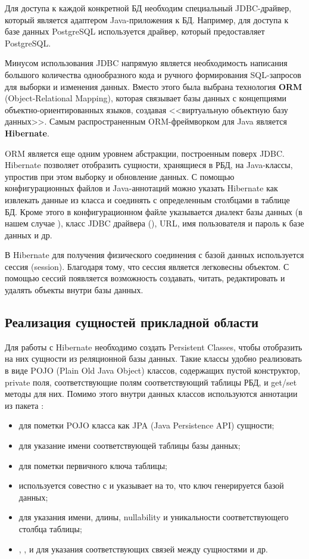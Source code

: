 Для доступа к каждой конкретной БД необходим специальный JDBC-драйвер, который является адаптером Java-приложения к БД. Например, для доступа к базе данных PostgreSQL используется драйвер, который предоставляет PostgreSQL. 

Минусом использования JDBC напрямую является необходимость написания большого количества однообразного кода и ручного формирования SQL-запросов для выборки и изменения данных. Вместо этого была выбрана технология \textbf{ORM} (Object-Relational Mapping), которая связывает базы данных с концепциями объектно-ориентированных языков, создавая <<виртуальную объектную базу данных>>. Самым распространенным ORM-фреймворком для Java является \textbf{Hibernate}.

ORM является еще одним уровнем абстракции, построенным поверх JDBC. Hibernate позволяет отобразить сущности, хранящиеся в РБД, на Java-классы, упростив при этом выборку и обновление данных. С помощью конфигурационных файлов и Java-аннотаций можно указать Hibernate как извлекать данные из класса и соединять с определенным столбцами в таблице БД. Кроме этого в конфигурационном файле указывается диалект базы данных (в нашем случае ), класс JDBC драйвера (), URL, имя пользователя и пароль к базе данных и др.

В Hibernate для получения физического соединения с базой данных  используется сессия (session). Благодаря тому, что сессия является легковесны объектом. С помощью сессий появляется возможность создавать, читать, редактировать и удалять объекты внутри базы данных.

\subsection{Реализация сущностей прикладной области}

Для работы с Hibernate необходимо создать Persistent Classes, чтобы отобразить на них сущности из реляционной базы данных. Такие классы удобно реализовать в виде POJO (Plain Old Java Object) классов, содержащих пустой конструктор, private поля, соответствующие полям соответствующий таблицы РБД, и get/set методы для них. Помимо этого внутри данных классов используются аннотации из пакета :
\begin{itemize}
	\item {} для пометки POJO класса как JPA (Java Persistence API) сущности;
	\item {} для указание имени соответствующей таблицы базы данных;
	\item {} для пометки первичного ключа таблицы;
	\item {} используется совестно с  и указывает на то, что ключ генерируется базой данных;
	\item {} для указания имени, длины, nullability и уникальности соответствующего столбца таблицы;
	\item {}, ,  и  для указания соответствующих связей между сущностями и др.
\end{itemize}


